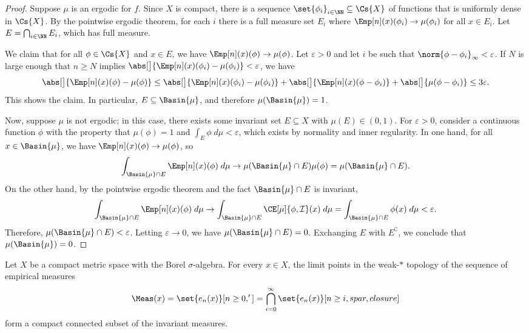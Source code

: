 \documentclass[../main]{subfiles}
\begin{document}
\begin{proof}
  Suppose \(\mu\) is an  ergodic for \(f\). Since \(X\) is compact, there is a sequence \(\set{\phi_i}_{i \in \NN} \subseteq \Cs{X}\) of functions that is uniformly dense in \(\Cs{X}\). By the pointwise ergodic theorem, for each \(i\) there is a full measure set \(E_i\) where \(\Emp[n](x)(\phi_i) \to \mu(\phi_i)\) for all \(x \in E_i\). Let \(E = \bigcap_{i \in \NN} E_i\), which has full measure.

  We claim that for all \(\phi \in \Cs{X}\) and \(x \in E\), we have \(\Emp[n](x)(\phi) \to \mu(\phi)\). Let \(\varepsilon > 0\) and let \(i\) be such that \(\norm{\phi - \phi_i}_{\infty} < \varepsilon\). If \(N\) is large enough that \(n \ge N\) implies \(\abs[\big]{\Emp[n](x)(\phi_i) - \mu(\phi_i)} < \varepsilon\), we have
  \[
    \abs[\big]{\Emp[n](x)(\phi) - \mu(\phi)} \le
    \abs[\big]{\Emp[n](x)(\phi_i) - \mu(\phi_i)} +
    \abs[\big]{\Emp[n](x)(\phi - \phi_i)} +
    \abs[\big]{\mu(\phi - \phi_i)} \le 3\varepsilon.
  \]
  This shows the claim. In particular, \(E \subseteq \Basin{\mu}\), and therefore \(\mu(\Basin{\mu}) = 1\).

  Now, suppose \(\mu\) is not ergodic; in this case, there exists some invariant set \(E \subseteq X\) with \(\mu(E) \in (0,1)\). For \(\varepsilon > 0\), consider a continuous function \(\phi\) with the property that \(\mu(\phi) = 1\) and \(\int_{E} \phi \;d\mu < \varepsilon\), which exists by normality and inner regularity. In one hand, for all \(x \in \Basin{\mu}\), we have \(\Emp[n](x)(\phi) \to \mu(\phi)\), so
  \[\int_{\Basin{\mu} \cap E}\Emp[n](x)(\phi)\;d\mu \to \mu({\Basin{\mu} \cap E})\mu(\phi) = \mu({\Basin{\mu} \cap E}).\]
  On the other hand, by the pointwise ergodic theorem and the fact \(\Basin{\mu}\cap E\) is invariant,
  \[\int_{\Basin{\mu} \cap E}\Emp[n](x)(\phi)\;d\mu \to
    \int_{\Basin{\mu}\cap E}\CE[\mu]{\phi, \mathcal{I}}(x)\;d\mu = 
    \int_{\Basin{\mu}\cap E}\phi(x)\;d\mu < \varepsilon.
  \]
  Therefore, \(\mu({\Basin{\mu} \cap E}) < \varepsilon\). Letting \(\varepsilon \to 0\), we have \(\mu({\Basin{\mu} \cap E}) = 0\). Exchanging \(E\) with \(E^{\complement}\), we conclude that \(\mu(\Basin{\mu}) = 0\).
\end{proof}

\begin{lemma}\label{prop:limiting-measures}
  Let \(X\) be a compact metric space with the Borel \(\sigma\)-algebra. For every \(x \in X\), the limit points in the weak-\(\ast\) topology of the sequence of empirical measures
  \begin{equation*}
    \Meas(x) = \set{ e_n(x) }[n \geq 0, '] = \bigcap_{i = 0}^{\infty} \set{ e_n(x) }[n \geq i,spar,closure]
  \end{equation*}
  form a compact connected subset of the invariant measures.
\end{lemma}
\end{document}
